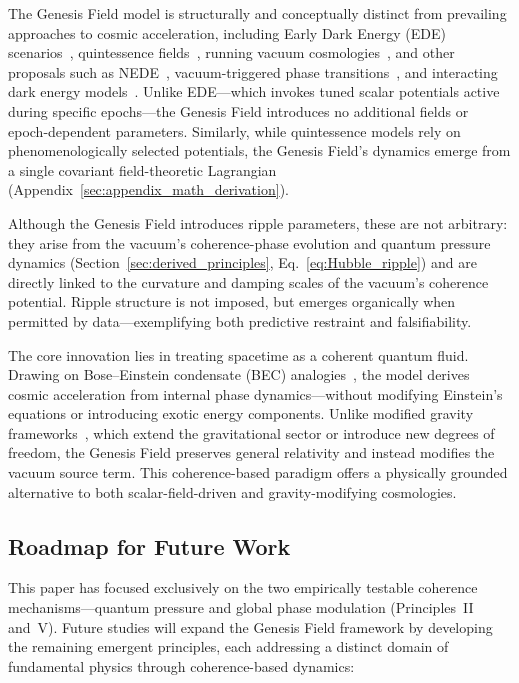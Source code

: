 The Genesis Field model is structurally and conceptually distinct from prevailing approaches to cosmic acceleration, including Early Dark Energy (EDE) scenarios~\cite{Poulin2019,Smith2020}, quintessence fields~\cite{Caldwell1998}, running vacuum cosmologies~\cite{sola2023}, and other proposals such as NEDE~\cite{Niedermann2021}, vacuum-triggered phase transitions~\cite{Freese2022}, and interacting dark energy models~\cite{DiValentino2020}. Unlike EDE—which invokes tuned scalar potentials active during specific epochs—the Genesis Field introduces no additional fields or epoch-dependent parameters. Similarly, while quintessence models rely on phenomenologically selected potentials, the Genesis Field’s dynamics emerge from a single covariant field-theoretic Lagrangian (Appendix~\ref{sec:appendix_math_derivation}).

Although the Genesis Field introduces ripple parameters, these are not arbitrary: they arise from the vacuum’s coherence-phase evolution and quantum pressure dynamics (Section~\ref{sec:derived_principles}, Eq.~\ref{eq:Hubble_ripple}) and are directly linked to the curvature and damping scales of the vacuum’s coherence potential. Ripple structure is not imposed, but emerges organically when permitted by data—exemplifying both predictive restraint and falsifiability.

The core innovation lies in treating spacetime as a coherent quantum fluid. Drawing on Bose–Einstein condensate (BEC) analogies~\cite{volovik2003universe,Barcelo2005}, the model derives cosmic acceleration from internal phase dynamics—without modifying Einstein’s equations or introducing exotic energy components. Unlike modified gravity frameworks~\cite{Clifton2012,Nojiri2017}, which extend the gravitational sector or introduce new degrees of freedom, the Genesis Field preserves general relativity and instead modifies the vacuum source term. This coherence-based paradigm offers a physically grounded alternative to both scalar-field-driven and gravity-modifying cosmologies.

\subsection{Roadmap for Future Work}
\label{sec:roadmap_future}

This paper has focused exclusively on the two empirically testable coherence mechanisms—quantum pressure and global phase modulation (Principles~II and~V). Future studies will expand the Genesis Field framework by developing the remaining emergent principles, each addressing a distinct domain of fundamental physics through coherence-based dynamics:


